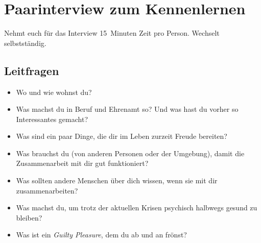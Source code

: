 \section{Paarinterview zum Kennenlernen}
\label{paarinterview}

Nehmt euch für das Interview 15~Minuten Zeit pro Person. Wechselt selbstständig.

\subsection{Leitfragen}

\begin{itemize}
 \item Wo und wie wohnst du?
 \item Was machst du in Beruf und Ehrenamt so? Und was hast du vorher so Interessantes gemacht?
 \item Was sind ein paar Dinge, die dir im Leben zurzeit Freude bereiten?
 \item Was brauchst du (von anderen Personen oder der Umgebung), damit die Zusammenarbeit mit dir gut funktioniert?
 \item Was sollten andere Menschen über dich wissen, wenn sie mit dir zusammenarbeiten?
 \item Was machst du, um trotz der aktuellen Krisen psychisch halbwegs gesund zu bleiben?
 \item Was ist ein \emph{Guilty Pleasure}, dem du ab und an frönst?
\end{itemize}
